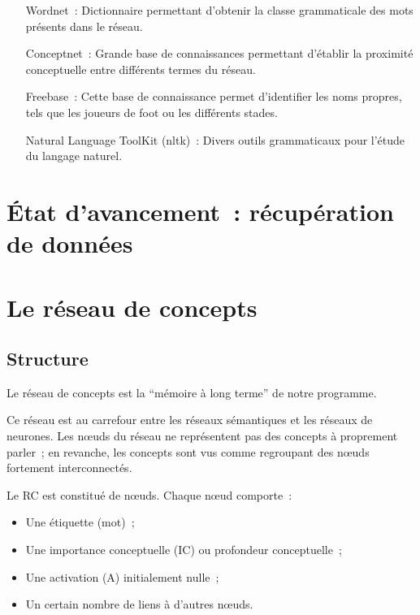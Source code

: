 \documentclass[a4paper,12pt]{article}
\begin{document}
\begin{itemize}
	\item[Wordnet~: ]Dictionnaire permettant d'obtenir la classe grammaticale des mots présents dans le réseau.
	\item[Conceptnet~: ]Grande base de connaissances permettant d'établir la proximité conceptuelle entre différents termes du réseau.
	\item[Freebase~: ]Cette base de connaissance permet d'identifier les noms propres, tels que les joueurs de foot ou les différents stades.
	\item[Natural Language ToolKit (nltk)~: ]Divers outils grammaticaux pour l'étude du langage naturel.
\end{itemize}

\section{\'Etat d'avancement~: r\'ecup\'eration de donn\'ees}

\section{Le r\'eseau de concepts}


\subsection{Structure}


\begin{definition}
Le réseau de concepts est la ``mémoire à long terme'' de notre programme.

Ce réseau est au carrefour entre les réseaux sémantiques et les réseaux de neurones. Les n\oe{}uds du réseau ne représentent pas des concepts à proprement parler~; en revanche, les concepts sont vus comme regroupant des n\oe{}uds fortement interconnectés.
\end{definition}


Le RC est constitué de n\oe{}uds. Chaque n\oe{}ud comporte~:
\begin{itemize}
  \item Une étiquette (mot)~;
 \item Une importance conceptuelle (IC) ou profondeur conceptuelle~;
 \item Une activation (A) initialement nulle~;
 \item Un certain nombre de liens à d'autres n\oe{}uds.
\end{itemize}
\end{document}
